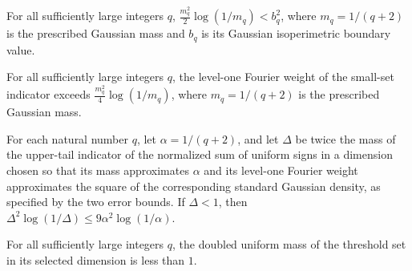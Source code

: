 \begin{theorem}
\label{FABL.eventually_gaussianMass_sq_log_div_two_lt_boundary_sq}
\leanok
{}
For all sufficiently large integers $q$, $\frac{m_q^2}{2}\log(1/m_q)<b_q^2$, where
$m_q=1/(q+2)$ is the prescribed Gaussian mass and $b_q$ is its Gaussian isoperimetric
boundary value.
\end{theorem}

\begin{theorem}
\label{FABL.eventually_gaussianMass_sq_log_div_four_lt_smallSetWeight}
\leanok
{}
For all sufficiently large integers $q$, the level-one Fourier weight of the small-set
indicator exceeds $\frac{m_q^2}{4}\log(1/m_q)$, where $m_q=1/(q+2)$ is the prescribed
Gaussian mass.
\end{theorem}

\begin{theorem}
\label{FABL.fknOptimalityDelta_sq_log_le}
\leanok
{}
For each natural number $q$, let $\alpha=1/(q+2)$, and let $\Delta$ be twice the mass of
the upper-tail indicator of the normalized sum of uniform signs in a dimension chosen so
that its mass approximates $\alpha$ and its level-one Fourier weight approximates the
square of the corresponding standard Gaussian density, as specified by the two error
bounds. If $\Delta<1$, then $\Delta^2\log(1/\Delta)\leq 9\alpha^2\log(1/\alpha)$.
\end{theorem}

\begin{theorem}
\label{FABL.eventually_fknOptimalityDelta_lt_one}
\leanok
{}
For all sufficiently large integers $q$, the doubled uniform mass of the threshold set
in its selected dimension is less than $1$.
\end{theorem}

